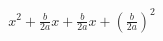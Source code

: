 \documentclass[preview]{standalone}
\begin{document}
\begin{align*}
{x}^{2} + \frac{b}{2 a} x + \frac{b}{2 a} x + {\left( \frac{b}{2 a} \right)}^{2}
\end{align*}
\end{document}
